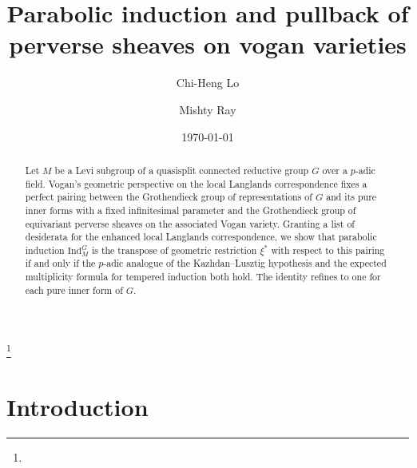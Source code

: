 \documentclass[11pt,letterpaper]{amsart}
\newcommand{\Ind}{\mathrm{Ind}}
\renewcommand{\1}{\mathbbm{1}}
\numberwithin{equation}{section}
\begin{document}
\title[induction restriction]{Parabolic induction and pullback of perverse sheaves on vogan varieties}



\author[Lo]{Chi-Heng Lo}
\address{Department of Mathematics,
National University of Singapore,
119076, Singapore}

\author[Ray]{Mishty Ray}
\address{Department of Mathematics\\
University of British Columbia\\
Vancouver, BC, V6T 1Z4,
CANADA}



\date{\today}


\thanks{}



\begin{abstract}
Let $M$ be a Levi subgroup of a quasisplit connected reductive group $G$ over a $p$-adic field. Vogan's geometric perspective on the local Langlands correspondence fixes a perfect pairing between the Grothendieck group of representations of $G$ and its pure inner forms with a fixed infinitesimal parameter and the Grothendieck group of equivariant perverse sheaves on the associated Vogan variety. Granting a list of desiderata for the enhanced local Langlands correspondence, we show that parabolic induction $\Ind_M^G$ is the transpose of geometric restriction $\xi^*$ with respect to this pairing if and only if the $p$-adic analogue of the Kazhdan--Lusztig hypothesis and the expected multiplicity formula for tempered induction both hold. The identity refines to one for each pure inner form of $G$. \end{abstract}



\maketitle

\tableofcontents

\section{Introduction}\label{sec: introduction}
\end{document}
